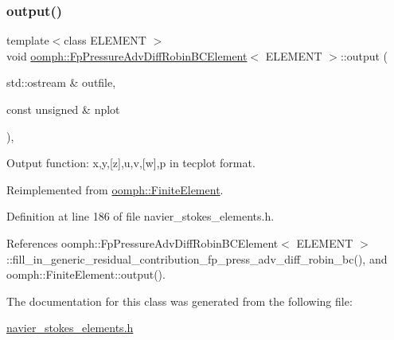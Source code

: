 \subsubsection{\texorpdfstring{output()}{output()}\hspace{0.1cm}{\footnotesize\ttfamily [2/2]}}
{\footnotesize\ttfamily template$<$class E\+L\+E\+M\+E\+NT $>$ \\
void \hyperlink{classoomph_1_1FpPressureAdvDiffRobinBCElement}{oomph\+::\+Fp\+Pressure\+Adv\+Diff\+Robin\+B\+C\+Element}$<$ E\+L\+E\+M\+E\+NT $>$\+::output (\begin{DoxyParamCaption}\item[{std\+::ostream \&}]{outfile,  }\item[{const unsigned \&}]{nplot }\end{DoxyParamCaption})\hspace{0.3cm}{\ttfamily [inline]}, {\ttfamily [virtual]}}



Output function\+: x,y,\mbox{[}z\mbox{]},u,v,\mbox{[}w\mbox{]},p in tecplot format. 



Reimplemented from \hyperlink{classoomph_1_1FiniteElement_afa9d9b2670f999b43e6679c9dd28c457}{oomph\+::\+Finite\+Element}.



Definition at line 186 of file navier\+\_\+stokes\+\_\+elements.\+h.



References oomph\+::\+Fp\+Pressure\+Adv\+Diff\+Robin\+B\+C\+Element$<$ E\+L\+E\+M\+E\+N\+T $>$\+::fill\+\_\+in\+\_\+generic\+\_\+residual\+\_\+contribution\+\_\+fp\+\_\+press\+\_\+adv\+\_\+diff\+\_\+robin\+\_\+bc(), and oomph\+::\+Finite\+Element\+::output().



The documentation for this class was generated from the following file\+:\begin{DoxyCompactItemize}
\item 
\hyperlink{navier__stokes__elements_8h}{navier\+\_\+stokes\+\_\+elements.\+h}\end{DoxyCompactItemize}
